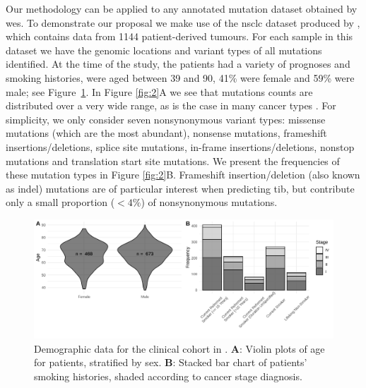 \documentclass[../thesis.tex]{subfiles}
\begin{document}
Our methodology can be applied to any annotated mutation dataset obtained by \gls{wes}.
To demonstrate our proposal we make use of the \gls{nsclc} dataset produced by \citet{campbell_distinct_2016}, which contains data from 1144 patient-derived tumours.  For each sample in this dataset we have the genomic locations and variant types of all mutations identified.  At the time of the study, the patients had a variety of prognoses and smoking histories, were aged between 39 and 90, 41\% were female and 59\% were male; see Figure~\ref{fig:1}. In Figure \ref{fig:2}A we see that mutations counts are distributed over a very wide range, as is the case in many cancer types \citep{chalmers_analysis_2017}. For simplicity, we only consider seven nonsynonymous variant types: missense mutations (which are the most abundant), nonsense mutations, frameshift insertions/deletions, splice site mutations, in-frame insertions/deletions, nonstop mutations and translation start site mutations.  We present the frequencies of these mutation types in Figure \ref{fig:2}B. Frameshift insertion/deletion (also known as indel) mutations are of particular interest when predicting \gls{tib}, but contribute only a small proportion ($<4\%$) of nonsynonymous mutations. 

\begin{figure}[htbp]
\centering
\includegraphics[width=6in]{figures/chapter3/fig1.png}
\vspace*{-5mm}
\caption{Demographic data for the clinical cohort in \citet{campbell_distinct_2016}. \textbf{A}: Violin plots of age for patients, stratified by sex. \textbf{B}: Stacked bar chart of patients' smoking histories, shaded according to cancer stage diagnosis. \label{fig:1}}
\vspace*{-2mm}
\end{figure}
\end{document}
